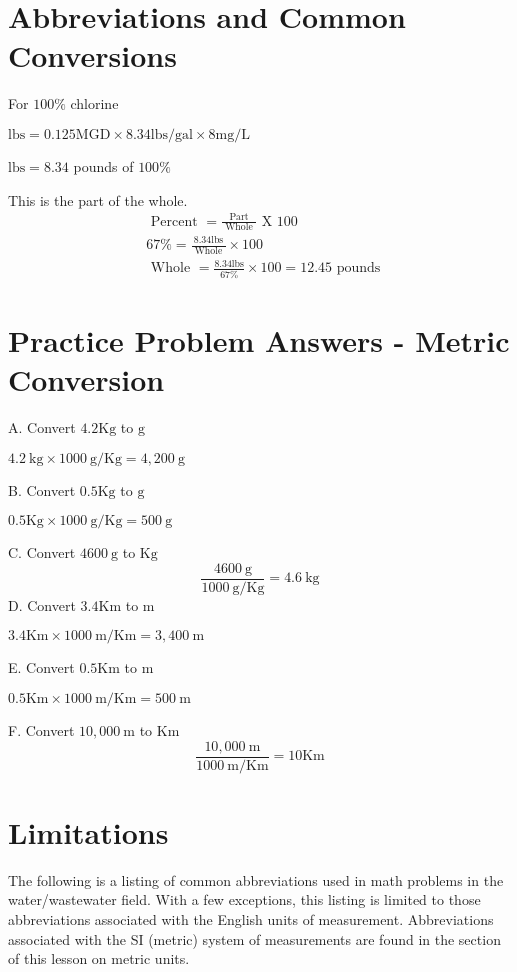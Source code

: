 \section{Abbreviations and Common Conversions}
For $100 \%$ chlorine

$\mathrm{lbs}=0.125 \mathrm{MGD} \times 8.34 \mathrm{lbs} / \mathrm{gal} \times 8 \mathrm{mg} / \mathrm{L}$

$\mathrm{lbs}=8.34$ pounds of $100 \%$

This is the part of the whole.
$$
\begin{aligned}
&\text { Percent }=\frac{\text { Part }}{\text { Whole }} \text { X } 100 \\
&67 \%=\frac{8.34 \mathrm{lbs}}{\text { Whole }} \times 100 \\
&\text { Whole }=\frac{8.34 \mathrm{lbs}}{67 \%} \times 100=12.45 \text { pounds }
\end{aligned}
$$

\section{Practice Problem Answers - Metric Conversion}
A. Convert $4.2 \mathrm{Kg}$ to $\mathrm{g}$

$4.2 \mathrm{~kg} \times 1000 \mathrm{~g} / \mathrm{Kg}=4,200 \mathrm{~g}$

B. Convert $0.5 \mathrm{Kg}$ to $\mathrm{g}$

$0.5 \mathrm{Kg} \times 1000 \mathrm{~g} / \mathrm{Kg}=500 \mathrm{~g}$

C. Convert $4600 \mathrm{~g}$ to $\mathrm{Kg}$
$$
\frac{4600 \mathrm{~g}}{1000 \mathrm{~g} / \mathrm{Kg}}=4.6 \mathrm{~kg}
$$
D. Convert $3.4 \mathrm{Km}$ to $\mathrm{m}$

$3.4 \mathrm{Km} \times 1000 \mathrm{~m} / \mathrm{Km}=3,400 \mathrm{~m}$

E. Convert $0.5 \mathrm{Km}$ to $\mathrm{m}$

$0.5 \mathrm{Km} \times 1000 \mathrm{~m} / \mathrm{Km}=500 \mathrm{~m}$

F. Convert $10,000 \mathrm{~m}$ to $\mathrm{Km}$
$$
\frac{10,000 \mathrm{~m}}{1000 \mathrm{~m} / \mathrm{Km}}=10 \mathrm{Km}
$$

\section{Limitations}
The following is a listing of common abbreviations used in math problems in the water/wastewater field. With a few exceptions, this listing is limited to those abbreviations associated with the English units of measurement. Abbreviations associated with the SI (metric) system of measurements are found in the section of this lesson on metric units.

